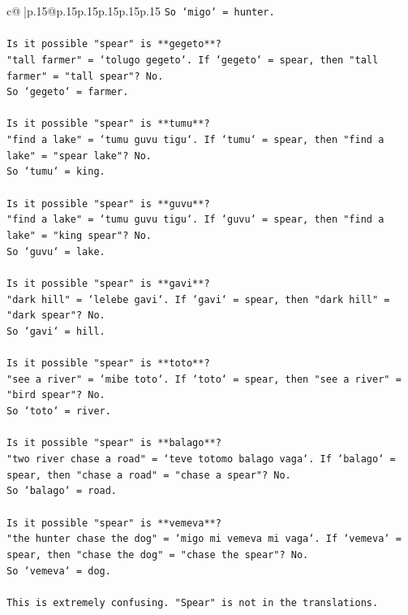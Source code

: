 \documentclass{article}
\begin{document}
{\begin{supertabular}{c@{$\;$}|p{.15\linewidth}@{}p{.15\linewidth}p{.15\linewidth}p{.15\linewidth}p{.15\linewidth}p{.15\linewidth}}
{{{\texttt{So `migo` = hunter.} \\
\\ 
\texttt{Is it possible "spear" is **gegeto**?} \\
\texttt{"tall farmer" = `tolugo gegeto`. If `gegeto` = spear, then "tall farmer" = "tall spear"? No.} \\
\texttt{So `gegeto` = farmer.} \\
\\ 
\texttt{Is it possible "spear" is **tumu**?} \\
\texttt{"find a lake" = `tumu guvu tigu`. If `tumu` = spear, then "find a lake" = "spear lake"? No.} \\
\texttt{So `tumu` = king.} \\
\\ 
\texttt{Is it possible "spear" is **guvu**?} \\
\texttt{"find a lake" = `tumu guvu tigu`. If `guvu` = spear, then "find a lake" = "king spear"? No.} \\
\texttt{So `guvu` = lake.} \\
\\ 
\texttt{Is it possible "spear" is **gavi**?} \\
\texttt{"dark hill" = `lelebe gavi`. If `gavi` = spear, then "dark hill" = "dark spear"? No.} \\
\texttt{So `gavi` = hill.} \\
\\ 
\texttt{Is it possible "spear" is **toto**?} \\
\texttt{"see a river" = `mibe toto`. If `toto` = spear, then "see a river" = "bird spear"? No.} \\
\texttt{So `toto` = river.} \\
\\ 
\texttt{Is it possible "spear" is **balago**?} \\
\texttt{"two river chase a road" = `teve totomo balago vaga`. If `balago` = spear, then "chase a road" = "chase a spear"? No.} \\
\texttt{So `balago` = road.} \\
\\ 
\texttt{Is it possible "spear" is **vemeva**?} \\
\texttt{"the hunter chase the dog" = `migo mi vemeva mi vaga`. If `vemeva` = spear, then "chase the dog" = "chase the spear"? No.} \\
\texttt{So `vemeva` = dog.} \\
\\ 
\texttt{This is extremely confusing. "Spear" is not in the translations.} \\
}}}
\end{supertabular}}
\end{document}
